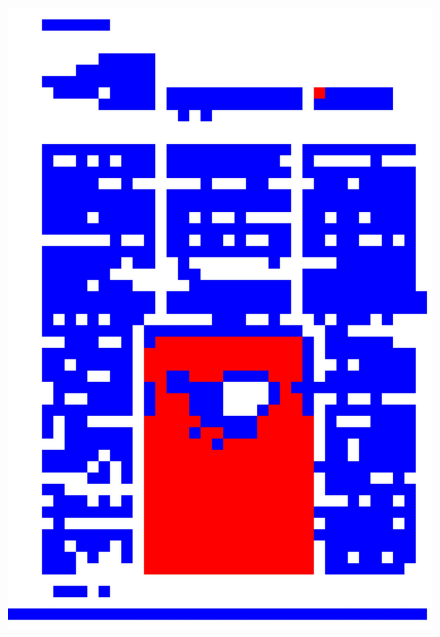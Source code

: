 \documentclass{book}
\begin{document}
\begin{figure}[H]
\begin{center}
\includegraphics[scale=0.06]{images/rect_50_res_hog_hsv_kmeans.jpg}

\end{center}
\end{figure}
\end{document}
